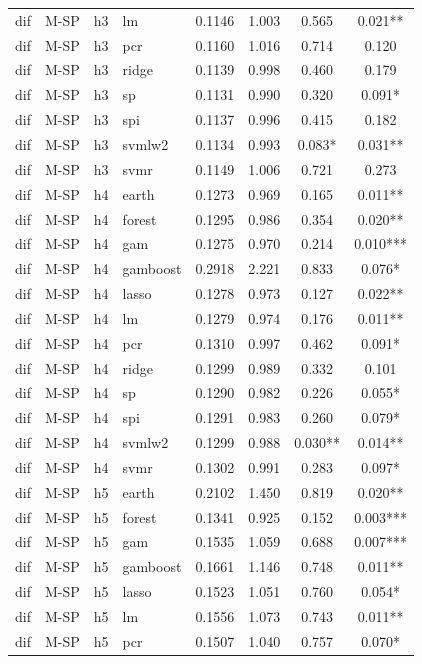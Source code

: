 \begin{ThreePartTable}
\begin{longtable}[t]{llclcccc}
dif & M-SP & h3 & lm & 0.1146 & 1.003 & 0.565 & 0.021**\\
dif & M-SP & h3 & pcr & 0.1160 & 1.016 & 0.714 & 0.120\\
dif & M-SP & h3 & ridge & 0.1139 & 0.998 & 0.460 & 0.179\\
dif & M-SP & h3 & sp & 0.1131 & 0.990 & 0.320 & 0.091*\\
dif & M-SP & h3 & spi & 0.1137 & 0.996 & 0.415 & 0.182\\
dif & M-SP & h3 & svmlw2 & 0.1134 & 0.993 & 0.083* & 0.031**\\
dif & M-SP & h3 & svmr & 0.1149 & 1.006 & 0.721 & 0.273\\
\addlinespace
dif & M-SP & h4 & earth & 0.1273 & 0.969 & 0.165 & 0.011**\\
dif & M-SP & h4 & forest & 0.1295 & 0.986 & 0.354 & 0.020**\\
dif & M-SP & h4 & gam & 0.1275 & 0.970 & 0.214 & 0.010***\\
dif & M-SP & h4 & gamboost & 0.2918 & 2.221 & 0.833 & 0.076*\\
dif & M-SP & h4 & lasso & 0.1278 & 0.973 & 0.127 & 0.022**\\
dif & M-SP & h4 & lm & 0.1279 & 0.974 & 0.176 & 0.011**\\
dif & M-SP & h4 & pcr & 0.1310 & 0.997 & 0.462 & 0.091*\\
dif & M-SP & h4 & ridge & 0.1299 & 0.989 & 0.332 & 0.101\\
dif & M-SP & h4 & sp & 0.1290 & 0.982 & 0.226 & 0.055*\\
dif & M-SP & h4 & spi & 0.1291 & 0.983 & 0.260 & 0.079*\\
dif & M-SP & h4 & svmlw2 & 0.1299 & 0.988 & 0.030** & 0.014**\\
dif & M-SP & h4 & svmr & 0.1302 & 0.991 & 0.283 & 0.097*\\
\addlinespace
dif & M-SP & h5 & earth & 0.2102 & 1.450 & 0.819 & 0.020**\\
dif & M-SP & h5 & forest & 0.1341 & 0.925 & 0.152 & 0.003***\\
dif & M-SP & h5 & gam & 0.1535 & 1.059 & 0.688 & 0.007***\\
dif & M-SP & h5 & gamboost & 0.1661 & 1.146 & 0.748 & 0.011**\\
dif & M-SP & h5 & lasso & 0.1523 & 1.051 & 0.760 & 0.054*\\
dif & M-SP & h5 & lm & 0.1556 & 1.073 & 0.743 & 0.011**\\
dif & M-SP & h5 & pcr & 0.1507 & 1.040 & 0.757 & 0.070*\\

\end{longtable}
\end{ThreePartTable}
